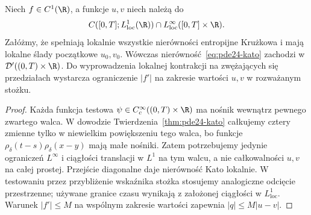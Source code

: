 \begin{lemat}
\label{lem:pde24-local-kato}
Niech $f\in C^1(\R)$, a funkcje $u,v$ niech należą do
\[
 C([0,T];L^1_{\mathrm{loc}}(\R))\cap
 L^\infty_{\mathrm{loc}}([0,T]\times\R).
\]
Załóżmy, że spełniają lokalnie wszystkie nierówności entropijne
Krużkowa i mają lokalne ślady początkowe $u_0,v_0$.
Wówczas nierówność~\eqref{eq:pde24-kato} zachodzi
w $\mathcal D'((0,T)\times\R)$. Do wyprowadzenia
lokalnej kontrakcji na zwężających się przedziałach
wystarcza ograniczenie $|f'|$ na zakresie wartości
$u,v$ w rozważanym stożku.
\end{lemat}
\begin{proof}
Każda funkcja testowa $\psi\in C_c^\infty((0,T)\times\R)$
ma nośnik wewnątrz pewnego zwartego walca.
W dowodzie Twierdzenia~\ref{thm:pde24-kato}
całkujemy cztery zmienne tylko w niewielkim powiększeniu
tego walca, bo funkcje
$\rho_\delta(t-s)\rho_\delta(x-y)$ mają małe nośniki.
Zatem potrzebujemy jedynie ograniczeń $L^\infty$
i ciągłości translacji w $L^1$ na tym walcu,
a nie całkowalności $u,v$ na całej prostej.
Przejście diagonalne daje nierówność Kato lokalnie.
W testowaniu przez przybliżenie wskaźnika stożka
stosujemy analogiczne odcięcie przestrzenne; używane
granice czasu wynikają z założonej ciągłości w
$L^1_{\mathrm{loc}}$. Warunek $|f'|\le M$ na
wspólnym zakresie wartości zapewnia $|q|\le M|u-v|$.
\end{proof}

